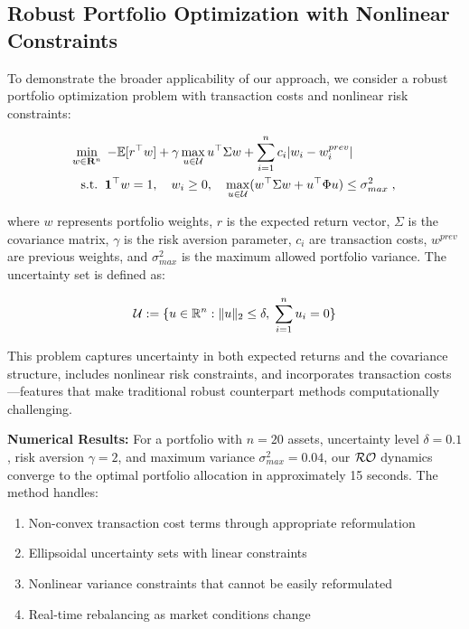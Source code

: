 \documentclass[journal,twoside,web]{ieeecolor}
\begin{document}
{\color{blue} \subsection{Robust Portfolio Optimization with Nonlinear Constraints}

To demonstrate the broader applicability of our approach, we consider a robust portfolio optimization problem with transaction costs and nonlinear risk constraints:

\begin{align} \label{portfolio_problem}
&\min_{w \in \mathbf{R}^n} \;-\mathbb{E}[r^\top w] + \gamma \max_{u \in {\cal U}} u^\top \Sigma w + \sum_{i=1}^n c_i |w_i - w_i^{prev}|\\
&\;\;\;\text{s.t.}\;\;\mathbf{1}^\top w = 1, \quad w_i \geq 0, \quad \max_{u \in {\cal U}} (w^\top \Sigma w + u^\top \Phi u) \leq \sigma_{max}^2\;,\;\nonumber
\end{align}

where $w$ represents portfolio weights, $r$ is the expected return vector, $\Sigma$ is the covariance matrix, $\gamma$ is the risk aversion parameter, $c_i$ are transaction costs, $w^{prev}$ are previous weights, and $\sigma_{max}^2$ is the maximum allowed portfolio variance. The uncertainty set is defined as:

\begin{align}
{\cal U} := \{u \in \mathbb{R}^n : \|u\|_2 \leq \delta, \; \sum_{i=1}^n u_i = 0\}
\end{align}

This problem captures uncertainty in both expected returns and the covariance structure, includes nonlinear risk constraints, and incorporates transaction costs—features that make traditional robust counterpart methods computationally challenging.

\textbf{Numerical Results:} For a portfolio with $n=20$ assets, uncertainty level $\delta=0.1$, risk aversion $\gamma=2$, and maximum variance $\sigma_{max}^2=0.04$, our ${\cal RO}$ dynamics converge to the optimal portfolio allocation in approximately 15 seconds. The method handles:

\begin{enumerate}
\item Non-convex transaction cost terms through appropriate reformulation
\item Ellipsoidal uncertainty sets with linear constraints
\item Nonlinear variance constraints that cannot be easily reformulated
\item Real-time rebalancing as market conditions change
\end{enumerate}

}
\end{document}
